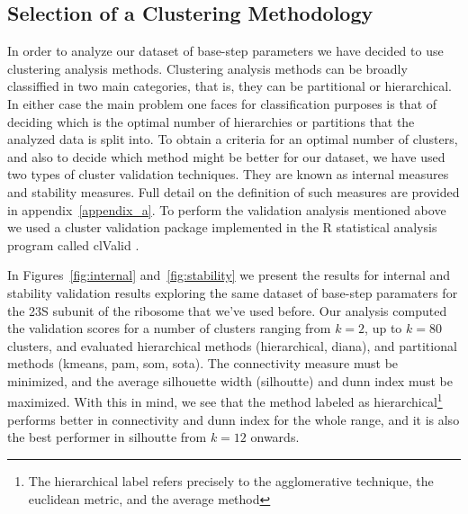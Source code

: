 \subsection{Selection of a Clustering Methodology}
In  order to  analyze  our  dataset of  base-step  parameters we  have
decided  to  use  clustering  analysis  methods.  Clustering  analysis
methods can  be broadly classiffied  in two main categories,  that is,
they  can be  partitional or  hierarchical.  In  either case  the main
problem  one faces for classification purposes is that of deciding
which  is the  optimal number  of hierarchies  or partitions  that the
analyzed  data is split  into.  To  obtain a  criteria for  an optimal
number of  clusters, and also to  decide which method  might be better
for  our  dataset,  we  have  used two  types  of  cluster  validation
techniques.   They  are  known  as  internal  measures  and  stability
measures. Full detail on the  definition of such measures are provided
in  appendix~\ref{appendix_a}.   To  perform the  validation  analysis
mentioned above  we used a  cluster validation package  implemented in
the  R  \cite{rcite}   statistical  analysis  program  called  clValid
\cite{brock2008}.

In  Figures~\ref{fig:internal} and~\ref{fig:stability} we  present the
results for  internal and  stability validation results  exploring the
same  dataset of  base-step  paramaters  for the  23S  subunit of  the
ribosome that we've used before.  Our analysis computed the validation
scores  for a  number of  clusters ranging  from $k=2$,  up  to $k=80$
clusters,  and evaluated  hierarchical methods  (hierarchical, diana),
and partitional  methods (kmeans,  pam, som, sota).   The connectivity
measure  must   be  minimized,   and  the  average   silhouette  width
(silhoutte) and  dunn index must be  maximized. With this  in mind, we
see that the  method labeled as hierarchical\footnote{The hierarchical
  label refers precisely to the agglomerative technique, the euclidean
  metric, and the average  method} performs better in connectivity and
dunn index for  the whole range, and it is also  the best performer in
silhoutte from $k=12$ onwards.

